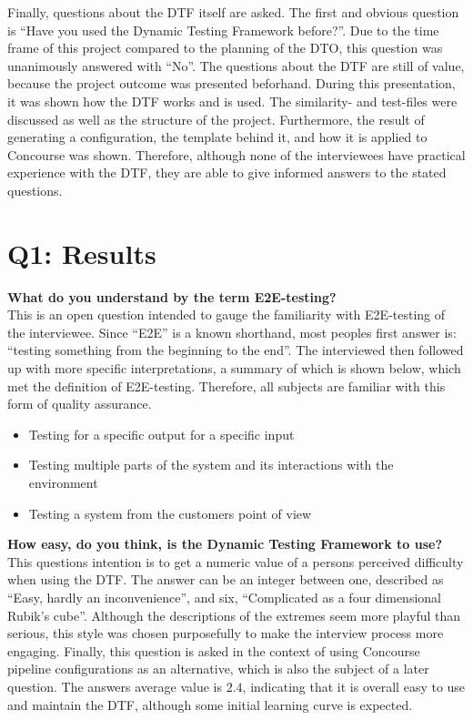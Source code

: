Finally, questions about the DTF itself are asked.
The first and obvious question is ``Have you used the Dynamic Testing Framework before?''.
Due to the time frame of this project compared to the planning of the DTO, this question was unanimously answered with ``No''.
The questions about the DTF are still of value, because the project outcome was presented beforhand.
During this presentation, it was shown how the DTF works and is used.
The similarity- and test-files were discussed as well as the structure of the project.
Furthermore, the result of generating a configuration, the template behind it, and how it is applied to Concourse was shown.
Therefore, although none of the interviewees have practical experience with the DTF, they are able to give informed answers to the stated questions.

\section{Q1: Results}\label{sec:q1:-results}

\textbf{What do you understand by the term E2E-testing?}\\
This is an open question intended to gauge the familiarity with E2E-testing of the interviewee.
Since ``E2E'' is a known shorthand, most peoples first answer is: ``testing something from the beginning to the end''.
The interviewed then followed up with more specific interpretations, a summary of which is shown below, which met the definition of E2E-testing.
Therefore, all subjects are familiar with this form of quality assurance.

\begin{itemize}
    \item Testing for a specific output for a specific input
    \item Testing multiple parts of the system and its interactions with the environment
    \item Testing a system from the customers point of view
\end{itemize}

\textbf{How easy, do you think, is the Dynamic Testing Framework to use?}\\
This questions intention is to get a numeric value of a persons perceived difficulty when using the DTF.
The answer can be an integer between one, described as ``Easy, hardly an inconvenience'', and six, ``Complicated as a four dimensional Rubik's cube''.
Although the descriptions of the extremes seem more playful than serious, this style was chosen purposefully to make the interview process more engaging.
Finally, this question is asked in the context of using Concourse pipeline configurations as an alternative, which is also the subject of a later question.
The answers average value is $2.4$, indicating that it is overall easy to use and maintain the DTF, although some initial learning curve is expected.

